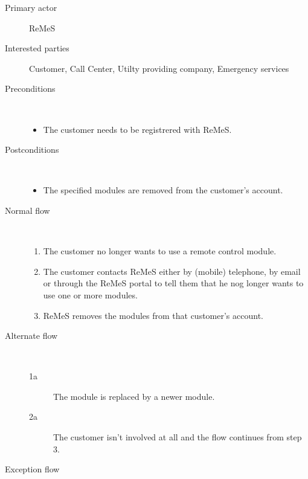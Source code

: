 \begin{description}
	\item[Primary actor] ReMeS
	\item[Interested parties] Customer, Call Center, Utilty providing company,
	Emergency services
	\item[Preconditions] \ 
	\begin{itemize}
		\item The customer needs to be registrered with ReMeS.
	\end{itemize}
	\item[Postconditions] \ 
	\begin{itemize}
		\item The specified modules are removed from the customer's account.
	\end{itemize}
	\item[Normal flow] \ 
	\begin{enumerate}
	  	\item The customer no longer wants to use a remote control module.
	  	\item The customer contacts ReMeS either by (mobile) telephone, by email or
	  	through the ReMeS portal to tell them that he nog longer wants to use one
	  	or more modules.
	  	\item ReMeS removes the modules from that customer's account. %
	\end{enumerate}
	\item[Alternate flow] \ 
	\begin{description}
		\item[1a] The module is replaced by a newer module.
		\item[2a] The customer isn't involved at all and the flow continues from step
		3.
	\end{description}
	\item[Exception flow] \ 
	\begin{description}
		\item
	\end{description}
\end{description}